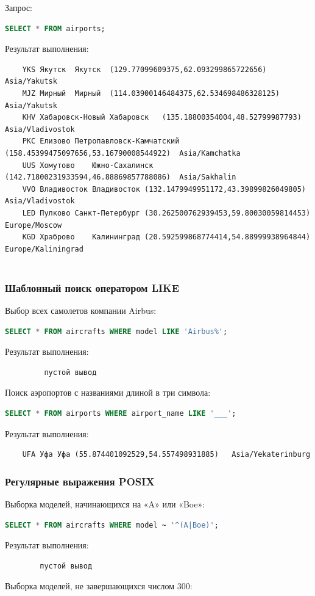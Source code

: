 \documentclass{bmstu-sob}
\begin{document}
	Запрос:
	\begin{lstlisting}[language=SQL]
		SELECT * FROM airports;
	\end{lstlisting}
	Результат выполнения:
	\begin{lstlisting}
	YKS	Якутск	Якутск	(129.77099609375,62.093299865722656)	Asia/Yakutsk
	MJZ	Мирный	Мирный	(114.03900146484375,62.534698486328125)	Asia/Yakutsk
	KHV	Хабаровск-Новый	Хабаровск	(135.18800354004,48.52799987793)	Asia/Vladivostok
	PKC	Елизово	Петропавловск-Камчатский	(158.45399475097656,53.16790008544922)	Asia/Kamchatka
	UUS	Хомутово	Южно-Сахалинск	(142.71800231933594,46.88869857788086)	Asia/Sakhalin
	VVO	Владивосток	Владивосток	(132.1479949951172,43.39899826049805)	Asia/Vladivostok
	LED	Пулково	Санкт-Петербург	(30.262500762939453,59.80030059814453)	Europe/Moscow
	KGD	Храброво	Калининград	(20.592599868774414,54.88999938964844)	Europe/Kaliningrad
	
	\end{lstlisting}
	
	\subsubsection{Шаблонный поиск оператором LIKE}
	Выбор всех самолетов компании Airbus:
	\begin{lstlisting}[language=SQL]
		SELECT * FROM aircrafts WHERE model LIKE 'Airbus%';
	\end{lstlisting}
	Результат выполнения:
	\begin{lstlisting}
		 пустой вывод
	\end{lstlisting}
	
	Поиск аэропортов с названиями длиной в три символа:
	\begin{lstlisting}[language=SQL]
		SELECT * FROM airports WHERE airport_name LIKE '___';
	\end{lstlisting}
	Результат выполнения:
	\begin{lstlisting}
	UFA	Уфа	Уфа	(55.874401092529,54.557498931885)	Asia/Yekaterinburg
	\end{lstlisting}
	
	\subsubsection{Регулярные выражения POSIX}
	Выборка моделей, начинающихся на «A» или «Boe»:
	\begin{lstlisting}[language=SQL]
		SELECT * FROM aircrafts WHERE model ~ '^(A|Boe)';
	\end{lstlisting}
	Результат выполнения:
	\begin{lstlisting}
		пустой вывод
	\end{lstlisting}
	Выборка моделей, не завершающихся числом 300:
	
\end{document}
